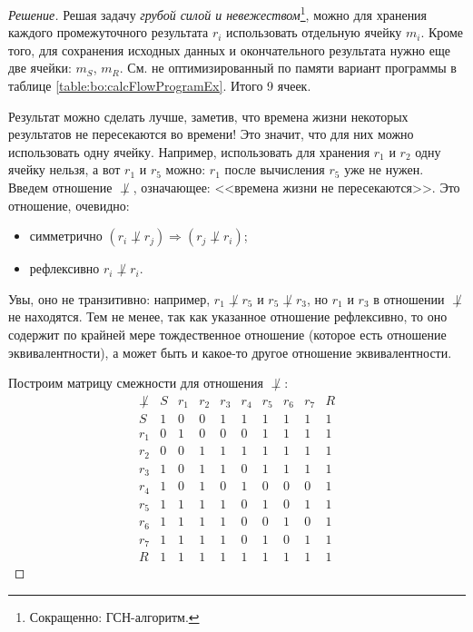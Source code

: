 \begin{proof}[Решение]
    Решая задачу \emph{грубой силой и невежеством}\footnote{Сокращенно: ГСН-алгоритм.}, можно для хранения каждого промежуточного результата $r_i$ использовать отдельную ячейку $m_i$. Кроме того, для сохранения исходных данных и окончательного результата нужно еще две ячейки: $m_S$, $m_R$. См. не оптимизированный по памяти вариант программы в таблице \ref{table:bo:calcFlowProgramEx}. Итого 9 ячеек.
    
    Результат можно сделать лучше, заметив, что времена жизни некоторых результатов не пересекаются во времени! Это значит, что для них можно использовать одну ячейку. Например, использовать для хранения $r_1$ и $r_2$ одну ячейку нельзя, а вот $r_1$ и $r_5$ можно: $r_1$ после вычисления $r_5$ уже не нужен. Введем отношение $\not\perp$, означающее: <<времена жизни не пересекаются>>. Это отношение, очевидно:
    \begin{itemize}
        \item симметрично $(r_i\not\perp r_j)\Rightarrow (r_j\not\perp r_i)$; 
        \item рефлексивно $r_i\not\perp r_i$.
    \end{itemize}
    Увы, оно не транзитивно: например, $r_1\not\perp r_5$ и $r_5\not\perp r_3$, но $r_1$ и $r_3$ в отношении $\not\perp$ не находятся. Тем не менее, так как указанное отношение рефлексивно, то оно содержит по крайней мере тождественное отношение (которое есть отношение эквивалентности), а может быть и какое-то другое отношение эквивалентности.
    
    Построим матрицу смежности для отношения $\not\perp$:
    \[
        \begin{array}{c|ccccccccc}
            \not\perp
                & S &r_1&r_2&r_3&r_4&r_5&r_6&r_7& R\\ \hline
            S   & 1 & 0 & 0 & 1 & 1 & 1 & 1 & 1 & 1\\
            r_1 & 0 & 1 & 0 & 0 & 0 & 1 & 1 & 1 & 1\\
            r_2 & 0 & 0 & 1 & 1 & 1 & 1 & 1 & 1 & 1\\
            r_3 & 1 & 0 & 1 & 1 & 0 & 1 & 1 & 1 & 1\\
            r_4 & 1 & 0 & 1 & 0 & 1 & 0 & 0 & 0 & 1\\
            r_5 & 1 & 1 & 1 & 1 & 0 & 1 & 0 & 1 & 1\\
            r_6 & 1 & 1 & 1 & 1 & 0 & 0 & 1 & 0 & 1\\
            r_7 & 1 & 1 & 1 & 1 & 0 & 1 & 0 & 1 & 1\\
            R   & 1 & 1 & 1 & 1 & 1 & 1 & 1 & 1 & 1
        \end{array}
    \]
    

\end{proof}
